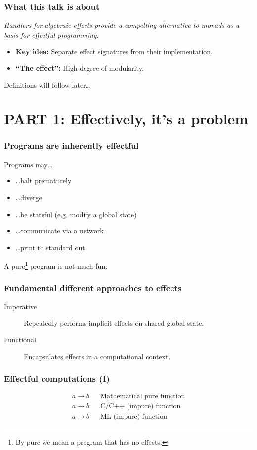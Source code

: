 \begin{frame}
  \frametitle{What this talk is about}
  \begin{center}
    \emph{Handlers for algebraic effects provide a compelling alternative to monads as a basis for effectful programming.}
  \end{center}
\begin{itemize}
  \item \textbf{Key idea:} Separate effect signatures from their implementation.
  \item \textbf{``The effect'':} High-degree of modularity.
\end{itemize}
{\footnotesize{Definitions will follow later\dots}}
\end{frame}

\section{PART 1: Effectively, it's a problem}

\begin{frame}
  \frametitle{Programs are inherently effectful}
  Programs may\dots
  \begin{itemize}
    \item \dots halt prematurely
    \item \dots diverge
    \item \dots be stateful (e.g. modify a global state)
    \item \dots communicate via a network
    \item \dots print to standard out
  \end{itemize}
  A pure\footnote{By pure we mean a program that has no effects.} program is not much fun.
\end{frame}

\begin{frame}
  \frametitle{Fundamental different approaches to effects}
  \begin{description}
    \item[\alert<1->{Imperative}] Repeatedly performs implicit effects on shared global state.
    \item[\alert<1->{Functional}] Encapsulates effects in a computational context.
  \end{description}
\end{frame}

\begin{frame}
  \frametitle{Effectful computations (I)}
  \begin{align*}
    a \to b && \text{Mathematical pure function}\\
    a \to b && \text{C/C++ (impure) function}\\
    a \to b && \text{ML (impure) function}
  \end{align*}
\end{frame}

